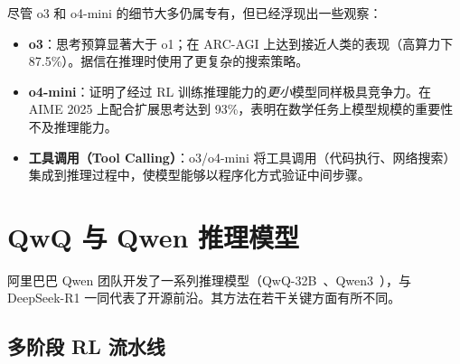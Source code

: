 尽管 o3 和 o4-mini 的细节大多仍属专有，但已经浮现出一些观察：

\begin{itemize}
  \item \textbf{o3}：思考预算显著大于 o1；在 ARC-AGI 上达到接近人类的表现（高算力下 87.5\%）。据信在推理时使用了更复杂的搜索策略。
  \item \textbf{o4-mini}：证明了经过 RL 训练推理能力的\emph{更小}模型同样极具竞争力。在 AIME 2025 上配合扩展思考达到 93\%，表明在数学任务上模型规模的重要性不及推理能力。
  \item \textbf{工具调用（Tool Calling）}：o3/o4-mini 将工具调用（代码执行、网络搜索）集成到推理过程中，使模型能够以程序化方式验证中间步骤。
\end{itemize}

\section{QwQ 与 Qwen 推理模型}
\label{subsec:qwq_qwen}

阿里巴巴 Qwen 团队开发了一系列推理模型（QwQ-32B~\cite{qwen2024qwq}、Qwen3~\cite{qwen2025qwen3}），与 DeepSeek-R1 一同代表了开源前沿。其方法在若干关键方面有所不同。

\subsection{多阶段 RL 流水线}
\label{multi-stage-rl-pipeline}

